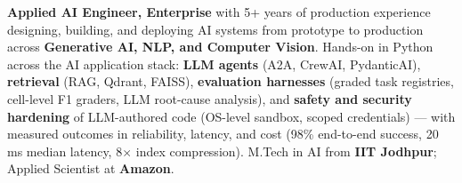 \documentclass[letter,10pt]{article}
\begin{document}

\textbf{Applied AI Engineer, Enterprise} with 5+ years of production experience designing, building, and deploying AI systems from prototype to production across \textbf{Generative AI, NLP, and Computer Vision}.
Hands-on in Python across the AI application stack: \textbf{LLM agents} (A2A, CrewAI, PydanticAI), \textbf{retrieval} (RAG, Qdrant, FAISS), \textbf{evaluation harnesses} (graded task registries, cell-level F1 graders, LLM root-cause analysis), and \textbf{safety and security hardening} of LLM-authored code (OS-level sandbox, scoped credentials) --- with measured outcomes in reliability, latency, and cost (98\% end-to-end success, 20\,ms median latency, 8$\times$ index compression).
M.Tech in AI from \textbf{IIT Jodhpur}; Applied Scientist at \textbf{Amazon}.
\end{document}
